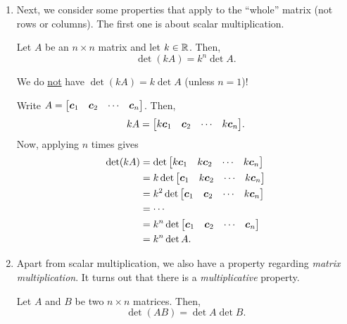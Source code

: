 \begin{enumerate}
\item Next, we consider some properties that apply to the ``whole'' matrix (not
rows or columns). The first one is about scalar multiplication.
\begin{proposition}
\label{prp:det-scalar-mult}
Let \(A\) be an \(n\times n\) matrix and let \(k\in\mathbb{R}\). Then,
\[
\det(kA)=k^n\det A.
\]
\begin{warning}
We do \underline{not} have \(\det(kA)=k\det A\) (unless \(n=1\))!
\end{warning}
\end{proposition}
\begin{pf}
Write \(A=\mqty[\vect{c}_{1}&\vect{c}_{2}&\cdots&\vect{c}_{n}]\). Then,
\[
kA=\mqty[k\vect{c}_{1}&\vect{c}_{2}&\cdots&k\vect{c}_{n}].
\]
Now, applying  \(n\) times gives
\begin{align*}
\det(kA)&=\det\mqty[k\vect{c}_{1}&k\vect{c}_{2}&\cdots&k\vect{c}_{n}]\\
&=k\det\mqty[\vect{c}_{1}&k\vect{c}_{2}&\cdots&k\vect{c}_{n}]\\
&=k^{2}\det\mqty[\vect{c}_{1}&\vect{c}_{2}&\cdots&k\vect{c}_{n}]\\
&=\dotsb\\
&=k^n\det\mqty[\vect{c}_{1}&\vect{c}_{2}&\cdots&\vect{c}_{n}]\\
&=k^n\det A.
\end{align*}
\end{pf}

\item Apart from scalar multiplication, we also have a property regarding
\emph{matrix multiplication}. It turns out that there is a
\emph{multiplicative} property.
\begin{proposition}[Multiplicative]
\label{prp:det-multiplicative}
Let \(A\) and \(B\) be two \(n\times n\) matrices. Then,
\[
\det(AB)=\det A\det B.
\]
\end{proposition}


\end{enumerate}
